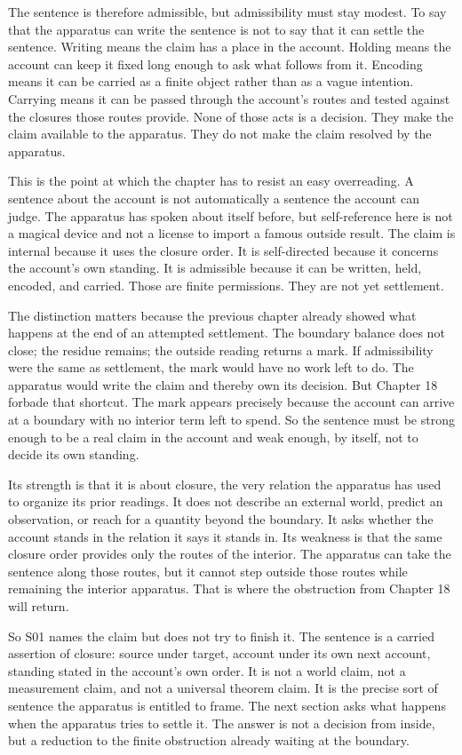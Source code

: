 The sentence is therefore admissible, but admissibility must stay modest. To say that the
apparatus can write the sentence is not to say that it can settle the sentence. Writing means the
claim has a place in the account. Holding means the account can keep it fixed long enough to ask
what follows from it. Encoding means it can be carried as a finite object rather than as a vague
intention. Carrying means it can be passed through the account's routes and tested against the
closures those routes provide. None of those acts is a decision. They make the claim available
to the apparatus. They do not make the claim resolved by the apparatus.

This is the point at which the chapter has to resist an easy overreading. A sentence about the
account is not automatically a sentence the account can judge. The apparatus has spoken about
itself before, but self-reference here is not a magical device and not a license to import a
famous outside result. The claim is internal because it uses the closure order. It is self-directed
because it concerns the account's own standing. It is admissible because it can be written,
held, encoded, and carried. Those are finite permissions. They are not yet settlement.

The distinction matters because the previous chapter already showed what happens at the end of
an attempted settlement. The boundary balance does not close; the residue remains; the outside
reading returns a mark. If admissibility were the same as settlement, the mark would have no
work left to do. The apparatus would write the claim and thereby own its decision. But Chapter
18 forbade that shortcut. The mark appears precisely because the account can arrive at a
boundary with no interior term left to spend. So the sentence must be strong enough to be a real
claim in the account and weak enough, by itself, not to decide its own standing.

Its strength is that it is about closure, the very relation the apparatus has used to organize
its prior readings. It does not describe an external world, predict an observation, or reach for
a quantity beyond the boundary. It asks whether the account stands in the relation it says it
stands in. Its weakness is that the same closure order provides only the routes of the interior.
The apparatus can take the sentence along those routes, but it cannot step outside those routes
while remaining the interior apparatus. That is where the obstruction from Chapter 18 will
return.

So S01 names the claim but does not try to finish it. The sentence is a carried assertion of
closure: source under target, account under its own next account, standing stated in the account's
own order. It is not a world claim, not a measurement claim, and not a universal theorem claim.
It is the precise sort of sentence the apparatus is entitled to frame. The next section asks
what happens when the apparatus tries to settle it. The answer is not a decision from inside,
but a reduction to the finite obstruction already waiting at the boundary.

